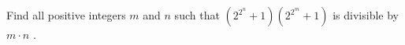 Find all positive integers $m$ and $n$ such that $(2^{2^{n}}+1)(2^{2^{m}}+1) $ is divisible by $m\cdot n $ .